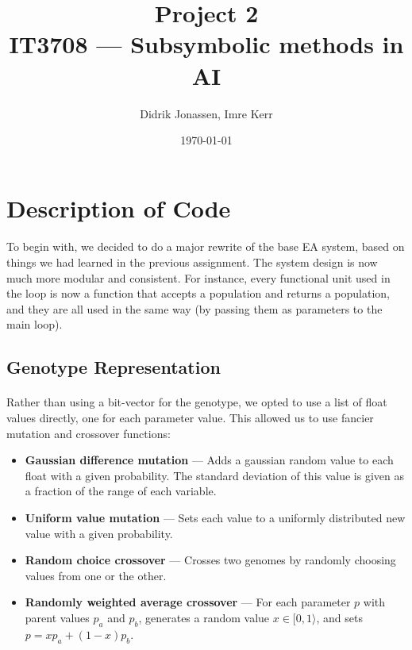 \documentclass[a4paper,12pt]{article}
\author{Didrik Jonassen, Imre Kerr}
\title{Project 2\\ IT3708 --- Subsymbolic methods in AI}
\date{\today}
\begin{document}
\maketitle

\section{Description of Code}

\paragraph{}To begin with, we decided to do a major rewrite of the base EA system, based on things we had learned in the previous assignment. The system design is now much more modular and consistent. For instance, every functional unit used in the loop is now a function that accepts a population and returns a population, and they are all used in the same way (by passing them as parameters to the main loop).

\subsection{Genotype Representation}

\paragraph{}Rather than using a bit-vector for the genotype, we opted to use a list of float values directly, one for each parameter value. This allowed us to use fancier mutation and crossover functions:
\begin{itemize}
\item{\textbf{Gaussian difference mutation} --- Adds a gaussian random value to each float with a given probability. The standard deviation of this value is given as a fraction of the range of each variable.}
\item{\textbf{Uniform value mutation} --- Sets each value to a uniformly distributed new value with a given probability.}
\item{\textbf{Random choice crossover} --- Crosses two genomes by randomly choosing values from one or the other.}
\item{\textbf{Randomly weighted average crossover} --- For each parameter $p$ with parent values $p_a$ and $p_b$, generates a random value $x \in [ 0, 1 \rangle$, and sets $p = x p_a + (1-x)p_b$.}
\end{itemize}
\end{document}
